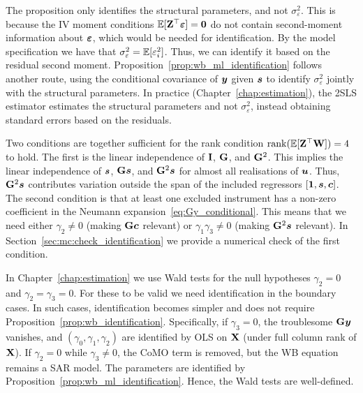 The proposition only identifies the structural parameters, and not $\sigma_\varepsilon^2$. This is because the IV moment conditions $\mathbb{E}[\mathbf{Z}^\top\bm{\varepsilon}] = \bm{0}$ do not contain second-moment information about $\bm{\varepsilon}$, which would be needed for identification. By the model specification we have that $\sigma_\varepsilon^2 = \mathbb{E}[\varepsilon_i^2]$. Thus, we can identify it based on the residual second moment. Proposition~\ref{prop:wb_ml_identification} follows another route, using the conditional covariance of $\bm{y}$ given $\bm{s}$ to identify $\sigma_\varepsilon^2$ jointly with the structural parameters. In practice (Chapter~\ref{chap:estimation}), the 2SLS estimator estimates the structural parameters and not $\sigma_\varepsilon^2$, instead obtaining standard errors based on the residuals.

\begin{remark}
\label{rem:wb_rank_sufficient}
Two conditions are together sufficient for the rank condition $\operatorname{rank}(\mathbb{E}[\mathbf{Z}^\top\mathbf{W}]) = 4$ to hold. The first is the linear independence of $\mathbf{I}$, $\mathbf{G}$, and $\mathbf{G}^2$. This implies the linear independence of $\bm{s}$, $\mathbf{G}\bm{s}$, and $\mathbf{G}^2\bm{s}$ for almost all realisations of $\bm{u}$. Thus, $\mathbf{G}^2\bm{s}$ contributes variation outside the span of the included regressors $[\bm{1}, \bm{s}, \bm{c}]$. The second condition is that at least one excluded instrument has a non-zero coefficient in the Neumann expansion~\eqref{eq:Gy_conditional}. This means that we need either $\gamma_2 \neq 0$ (making $\mathbf{G}\bm{c}$ relevant) or $\gamma_1\gamma_3 \neq 0$ (making $\mathbf{G}^2\bm{s}$ relevant). In Section~\ref{sec:mc:check_identification} we provide a numerical check of the first condition.
\end{remark}

\begin{remark}
\label{rem:boundary_cases}
In Chapter~\ref{chap:estimation} we use Wald tests for the null hypotheses $\gamma_2 = 0$ and $\gamma_2 = \gamma_3 = 0$. For these to be valid we need identification in the boundary cases. In such cases, identification becomes simpler and does not require Proposition~\ref{prop:wb_identification}. Specifically, if $\gamma_3 = 0$, the troublesome $\mathbf{G}\bm{y}$ vanishes, and $(\gamma_0, \gamma_1, \gamma_2)$ are identified by OLS on $\mathbf{X}$ (under full column rank of $\mathbf{X}$). If $\gamma_2 = 0$ while $\gamma_3 \neq 0$, the CoMO term is removed, but the WB equation remains a SAR model. The parameters are identified by Proposition~\ref{prop:wb_ml_identification}. Hence, the Wald tests are well-defined.
\end{remark}

